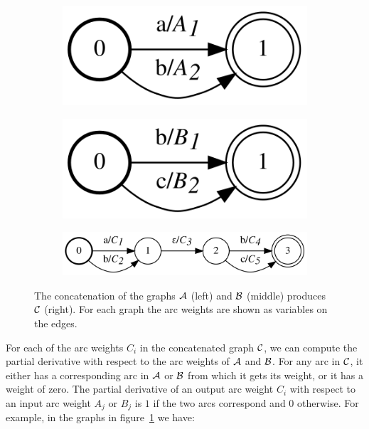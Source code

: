 \begin{figure}
    \centering
    \begin{subfigure}[b]{0.23\textwidth}
        \centering
        \includegraphics[scale=0.6]{figures/concat_grad_A}
    \end{subfigure}
    \begin{subfigure}[b]{0.23\textwidth}
        \centering
        \includegraphics[scale=0.6]{figures/concat_grad_B}
    \end{subfigure}
    \begin{subfigure}[b]{.52\textwidth}
        \centering
        \includegraphics[scale=0.6]{figures/concat_grad_C}
    \end{subfigure}
    \caption{The concatenation of the graphs $\mathcal{A}$ (left) and $\mathcal{B}$ (middle)
    produces $\mathcal{C}$ (right). For each graph the arc weights are shown as
    variables on the edges.}
    \label{fig:concat_grad}
\end{figure}

For each of the arc weights $C_i$ in the concatenated graph $\mathcal{C}$, we can
compute the partial derivative with respect to the arc weights of $\mathcal{A}$ and
$\mathcal{B}$. For any arc in $\mathcal{C}$, it either has a corresponding arc in $\mathcal{A}$ or
$\mathcal{B}$ from which it gets its weight, or it has a weight of zero. The partial
derivative of an output arc weight $C_i$ with respect to an input arc weight
$A_j$ or $B_j$ is $1$ if the two arcs correspond and $0$ otherwise. For
example, in the graphs in figure~\ref{fig:concat_grad} we have:

